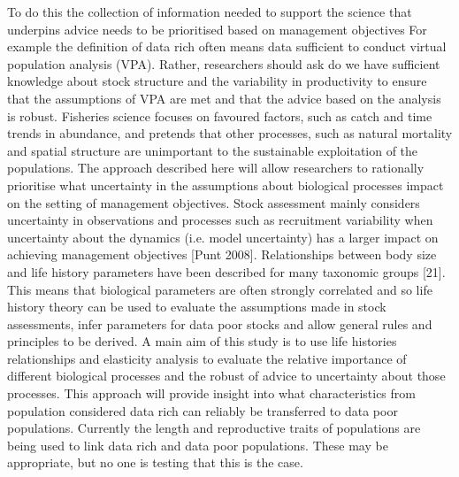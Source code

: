 \documentclass{pnastwo}
\begin{document}
\begin{article}
To do this the collection of information needed to support the science that underpins advice needs to be prioritised based on management objectives For example the definition of data rich often means data suﬃcient to conduct virtual population analysis (VPA). Rather, researchers should ask do we have suﬃcient knowledge about stock structure and the variability in productivity to ensure that the assumptions of VPA are met and that the advice based on the analysis is robust. Fisheries science focuses on favoured factors, such as catch and time trends in abundance, and pretends that other processes, such as natural mortality and spatial structure are unimportant to the sustainable exploitation of the populations. The approach described here will allow researchers to rationally prioritise what uncertainty in the assumptions about biological processes impact on the setting of management objectives.
Stock assessment mainly considers uncertainty in observations and processes such as recruitment variability when uncertainty about the dynamics (i.e. model uncertainty) has a larger impact on achieving management objectives [Punt 2008]. Relationships between body size and life history parameters have been described for many taxonomic groups [21]. This means that biological parameters are often strongly correlated and so life history theory can be used to evaluate the assumptions made in stock assessments, infer parameters for data poor stocks and allow general rules and principles to be derived. A main aim of this study is to use life histories relationships and elasticity analysis to evaluate the relative importance of diﬀerent biological processes and the robust of advice to uncertainty about those processes. This approach will provide insight into what characteristics from population considered data rich can reliably be transferred to data poor populations. Currently the length and reproductive traits of populations are being used to link data rich and data poor populations. These may be appropriate, but no one is testing that this is the case.



\end{article}
\end{document}
